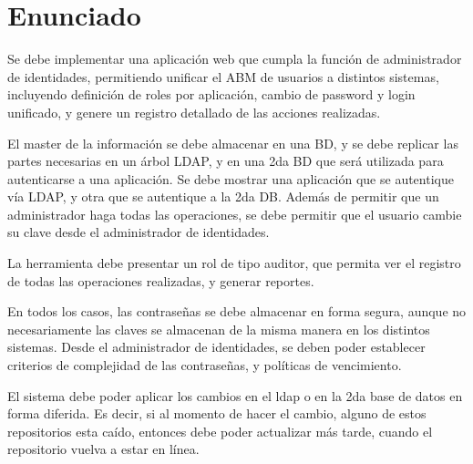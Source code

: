 \section{Enunciado}

Se debe implementar una aplicación web que cumpla la función de administrador de identidades,
permitiendo unificar el ABM de usuarios a distintos sistemas, incluyendo definición de roles por
aplicación, cambio de password y login unificado, y genere un registro detallado de las acciones
realizadas.

El master de la información se debe almacenar en una BD, y se debe replicar las partes necesarias en un
árbol LDAP, y en una 2da BD que será utilizada para autenticarse a una aplicación. Se debe mostrar una
aplicación que se autentique vía LDAP, y otra que se autentique a la 2da DB. Además de permitir que un
administrador haga todas las operaciones, se debe permitir que el usuario cambie su clave desde el
administrador de identidades.

La herramienta debe presentar un rol de tipo auditor, que permita ver el registro de todas las
operaciones realizadas, y generar reportes.

En todos los casos, las contraseñas se debe almacenar en forma segura, aunque no necesariamente las
claves se almacenan de la misma manera en los distintos sistemas. Desde el administrador de
identidades, se deben poder establecer criterios de complejidad de las contraseñas, y políticas de
vencimiento.

El sistema debe poder aplicar los cambios en el ldap o en la 2da base de datos en forma diferida. Es
decir, si al momento de hacer el cambio, alguno de estos repositorios esta caído, entonces debe poder
actualizar más tarde, cuando el repositorio vuelva a estar en línea.


